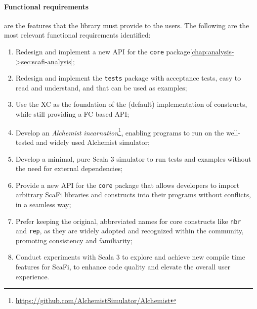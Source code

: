 \paragraph{Functional requirements} are the features that the library must provide to the users. The following are the most relevant functional requirements identified:
\begin{enumerate}[label=\textbf{F.\arabic*}]
    \item Redesign and implement a new \ac{API} for the \texttt{core} package\cref{chap:analysis->sec:scafi-analysis};
    \item Redesign and implement the \texttt{tests} package with acceptance tests, easy to read and understand, and that can be used as examples;
    \item Use the \ac{XC} as the foundation of the (default) implementation of constructs, while still providing a \ac{FC} based API;
    \item Develop an \textit{Alchemist incarnation}\footnote{\url{https://github.com/AlchemistSimulator/Alchemist}}\cite{alchemist}, enabling \this programs to run on the well-tested and widely used Alchemist simulator;
    \item Develop a minimal, pure Scala 3 simulator to run tests and examples without the need for external dependencies;
    \item Provide a new API for the \texttt{core} package that allows developers to import arbitrary ScaFi libraries and constructs into their programs without conflicts, in a seamless way;
    \item Prefer keeping the original, abbreviated names for core constructs like \texttt{nbr} and \texttt{rep}, as they are widely adopted and recognized within the community, promoting consistency and familiarity;
    \item Conduct experiments with Scala 3 to explore and achieve new compile time features for ScaFi, to enhance code quality and elevate the overall user experience.
\end{enumerate}

